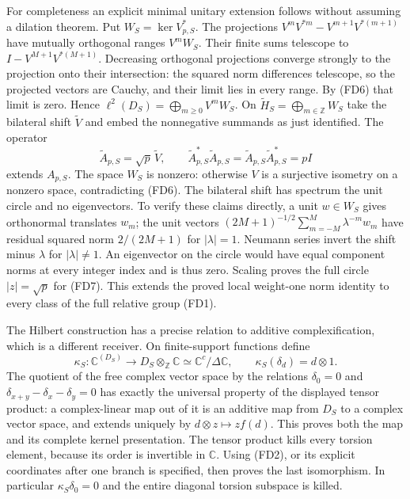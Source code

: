 \documentclass[11pt,a4paper]{article}
\theoremstyle{definition}\newtheorem{definition}[theorem]{Definition}
\begin{document}
For completeness an explicit minimal unitary extension follows without
assuming a dilation theorem. Put $W_S=\ker V_{p,S}^*$. The projections
$V^mV^{*m}-V^{m+1}V^{*(m+1)}$ have mutually orthogonal ranges $V^mW_S$.
Their finite sums telescope to $I-V^{M+1}V^{*(M+1)}$. Decreasing
orthogonal projections converge strongly to the projection onto their
intersection: the squared norm differences telescope, so the projected
vectors are Cauchy, and their limit lies in every range. By (FD6) that
limit is zero. Hence
$\ell^2(D_S)=\bigoplus_{m\ge0}V^mW_S$. On
$\widetilde H_S=\bigoplus_{m\in\mathbb Z}W_S$ take the bilateral
shift $\widetilde V$ and embed the nonnegative summands as just
identified. The operator
\[
 \widetilde A_{p,S}=\sqrt p\,\widetilde V,
 \qquad \widetilde A_{p,S}^*\widetilde A_{p,S}
        =\widetilde A_{p,S}\widetilde A_{p,S}^*=pI
 \tag{FD7}
\]
extends $A_{p,S}$. The space $W_S$ is nonzero: otherwise $V$ is a
surjective isometry on a nonzero space, contradicting (FD6).
The bilateral shift has spectrum the unit circle and no eigenvectors.
To verify these claims directly, a unit $w\in W_S$ gives orthonormal
translates $w_m$; the unit vectors
$(2M+1)^{-1/2}\sum_{m=-M}^M\lambda^{-m}w_m$ have residual squared
norm $2/(2M+1)$ for $|\lambda|=1$. Neumann series invert the shift
minus $\lambda$ for $|\lambda|\ne1$. An eigenvector on the circle
would have equal component norms at every integer index and is thus
zero. Scaling proves the full circle $|z|=\sqrt p$ for (FD7).
This extends the proved local weight-one norm identity to every class
of the full relative group (FD1).

The Hilbert construction has a precise relation to additive
complexification, which is a different receiver. On finite-support
functions define
\[
 \kappa_S:\mathbb C^{(D_S)}\longrightarrow D_S\otimes_{\mathbb Z}\mathbb C
       \simeq\mathbb C^c/\Delta\mathbb C,
 \qquad \kappa_S(\delta_d)=d\otimes1.
 \tag{FD8}
\]
The quotient of the free complex vector space by the relations
$\delta_0=0$ and $\delta_{x+y}-\delta_x-\delta_y=0$ has exactly the
universal property of the displayed tensor product: a complex-linear
map out of it is an additive map from $D_S$ to a complex vector space,
and extends uniquely by $d\otimes z\mapsto z f(d)$. This proves both
the map and its complete kernel presentation. The tensor product kills
every torsion element, because its order is invertible in $\mathbb C$.
Using (FD2), or its explicit coordinates after one branch is specified,
then proves the last isomorphism. In particular $\kappa_S\delta_0=0$
and the entire diagonal torsion subspace is killed.
\end{document}
